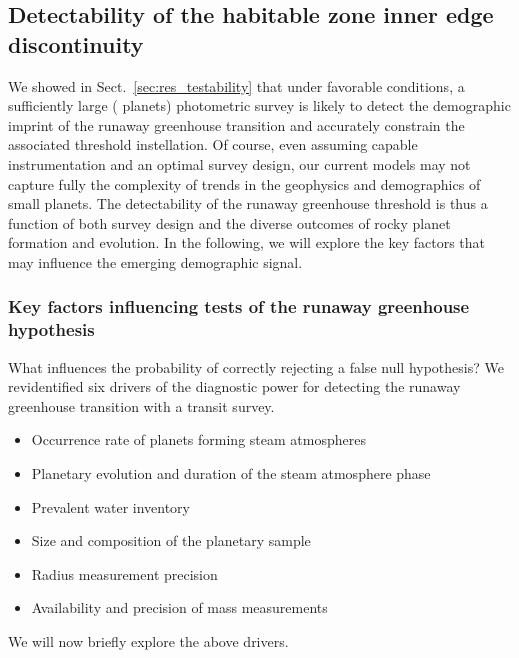 \documentclass[twocolumn,twocolappendix,linenumbers]{aastex631}
\begin{document}
\subsection{Detectability of the habitable zone inner edge discontinuity}
We showed in Sect.~\ref{sec:res_testability} that under favorable conditions, a sufficiently large ( planets) photometric survey is likely to detect the demographic imprint of the runaway greenhouse transition and accurately constrain the associated threshold instellation.
Of course, even assuming capable instrumentation and an optimal survey design, our current models may not capture fully the complexity of trends in the geophysics and demographics of small planets.
The detectability of the runaway greenhouse threshold is thus a function of both survey design and the diverse outcomes of rocky planet formation and evolution.
In the following, we will explore the key factors that may influence the emerging demographic signal.

\subsubsection{Key factors influencing tests of the runaway greenhouse hypothesis}\label{sec:dis_keyfactors}
What influences the probability of correctly rejecting a false null hypothesis?
We rev{identified six drivers} of the diagnostic power for detecting the runaway greenhouse transition with a transit survey.
\begin{itemize}
    \item Occurrence rate of planets forming steam atmospheres
    \item Planetary evolution and duration of the steam atmosphere phase
    \item Prevalent water inventory
    \item Size and composition of the planetary sample
    \item Radius measurement precision
    \item Availability and precision of mass measurements
\end{itemize}
We will now briefly explore the above drivers.
\end{document}
